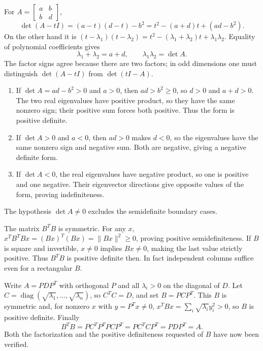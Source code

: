 For $A=\begin{bmatrix}a&b\\b&d\end{bmatrix}$,
\[
 \det(A-tI)=(a-t)(d-t)-b^2
 =t^2-(a+d)t+(ad-b^2).
\]
On the other hand it is
$(t-\lambda_1)(t-\lambda_2)=t^2-(\lambda_1+\lambda_2)t+
\lambda_1\lambda_2$.
Equality of polynomial coefficients gives
\[
 \boxed{\lambda_1+\lambda_2=a+d,\qquad
 \lambda_1\lambda_2=\det A}.
\]
The factor signs agree because there are two factors; in odd dimensions
one must distinguish $\det(A-tI)$ from $\det(tI-A)$.

\begin{enumerate}[label=(\alph*)]
\item If $\det A=ad-b^2>0$ and $a>0$, then $ad>b^2\ge0$,
so $d>0$ and $a+d>0$. The two real eigenvalues have positive product,
so they have the same nonzero sign; their positive sum forces both positive.
Thus the form is positive definite.
\item If $\det A>0$ and $a<0$, then $ad>0$ makes $d<0$,
so the eigenvalues have the same nonzero sign and negative sum. Both are
negative, giving a negative definite form.
\item If $\det A<0$, the real eigenvalues have negative product,
so one is positive and one negative. Their eigenvector directions give
opposite values of the form, proving indefiniteness.
\end{enumerate}
The hypothesis $\det A\ne0$ excludes the semidefinite boundary cases.

The matrix $B^TB$ is symmetric. For any $x$,
$x^TB^TBx=(Bx)^T(Bx)=\|Bx\|^2\ge0$, proving positive semidefiniteness.
If $B$ is square and invertible, $x\ne0$ implies $Bx\ne0$, making the
last value strictly positive. Thus $B^TB$ is positive definite then.
In fact independent columns suffice even for a rectangular $B$.

Write $A=PDP^T$ with orthogonal $P$ and all $\lambda_i>0$ on the diagonal
of $D$. Let $C=\operatorname{diag}(\sqrt{\lambda_1},\ldots,
\sqrt{\lambda_n})$, so $C^TC=D$, and set $B=PCP^T$.
This $B$ is symmetric and, for nonzero $x$ with $y=P^Tx\ne0$,
$x^TBx=\sum_i\sqrt{\lambda_i}y_i^2>0$, so $B$ is positive definite.
Finally
\[
 B^TB=PC^TP^TPCP^T=PC^TCP^T=PDP^T=A.
\]
Both the factorization and the positive definiteness requested of $B$
have now been verified.


